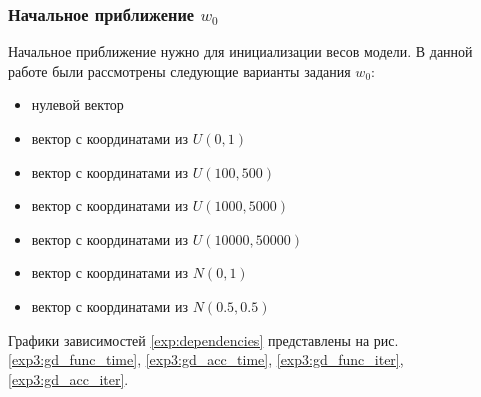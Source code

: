 \documentclass[a4paper, 11pt]{article}
\begin{document}
            \subsubsection{Начальное приближение $w_0$}
                Начальное приближение нужно для инициализации весов модели. В данной работе были рассмотрены следующие варианты задания $w_0$:
                \begin{itemize}
                    \item нулевой вектор
                    \item вектор с координатами из $U(0, 1)$
                    \item вектор с координатами из $U(100, 500)$
                    \item вектор с координатами из $U(1000, 5000)$
                    \item вектор с координатами из $U(10000, 50000)$
                    \item вектор с координатами из $N(0, 1)$
                    \item вектор с координатами из $N(0.5, 0.5)$
                \end{itemize}
                Графики зависимостей \ref{exp:dependencies} представлены на рис.  \ref{exp3:gd_func_time}, \ref{exp3:gd_acc_time}, \ref{exp3:gd_func_iter}, \ref{exp3:gd_acc_iter}.
\end{document}
